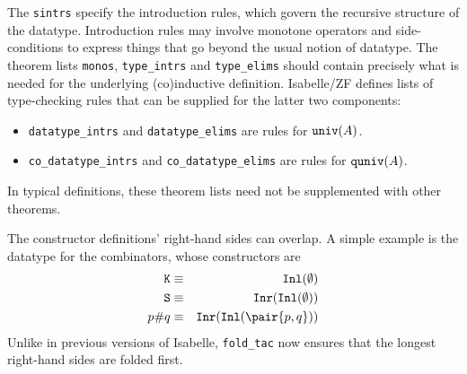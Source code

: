 The {\tt sintrs} specify the introduction rules, which govern the recursive
structure of the datatype.  Introduction rules may involve monotone
operators and side-conditions to express things that go beyond the usual
notion of datatype.  The theorem lists {\tt monos}, {\tt type\_intrs} and
{\tt type\_elims} should contain precisely what is needed for the
underlying (co)inductive definition.  Isabelle/ZF defines lists of
type-checking rules that can be supplied for the latter two components:
\begin{itemize}
\item {\tt datatype\_intrs} and {\tt datatype\_elims} are rules
for ${\tt univ}(A)$.
\item {\tt co\_datatype\_intrs} and {\tt co\_datatype\_elims} are
rules for ${\tt quniv}(A)$.
\end{itemize}
In typical definitions, these theorem lists need not be supplemented with
other theorems.

The constructor definitions' right-hand sides can overlap.  A
simple example is the datatype for the combinators, whose constructors are 
\begin{eqnarray*}
  {\tt K} & \equiv & \Inl(\emptyset) \\
  {\tt S} & \equiv & \Inr(\Inl(\emptyset)) \\
  p{\tt\#}q & \equiv & \Inr(\Inl(\pair{p,q})) 
\end{eqnarray*}
Unlike in previous versions of Isabelle, \verb|fold_tac| now ensures that the
longest right-hand sides are folded first.

\fi

